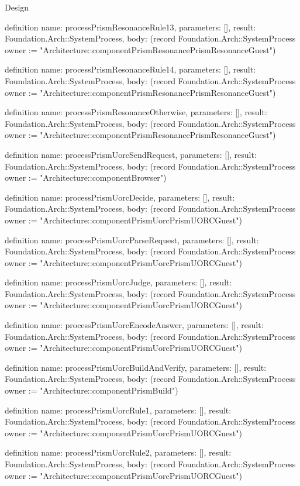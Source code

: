 \begin{lexlean}{Design}
\begin{semanticmodule}
definition{
  name: processPrismResonanceRule13,
  parameters: [],
  result: Foundation.Arch::SystemProcess,
  body: (record Foundation.Arch::SystemProcess {owner := "Architecture::componentPrismResonancePrismResonanceGuest"})
}

definition{
  name: processPrismResonanceRule14,
  parameters: [],
  result: Foundation.Arch::SystemProcess,
  body: (record Foundation.Arch::SystemProcess {owner := "Architecture::componentPrismResonancePrismResonanceGuest"})
}

definition{
  name: processPrismResonanceOtherwise,
  parameters: [],
  result: Foundation.Arch::SystemProcess,
  body: (record Foundation.Arch::SystemProcess {owner := "Architecture::componentPrismResonancePrismResonanceGuest"})
}

definition{
  name: processPrismUorcSendRequest,
  parameters: [],
  result: Foundation.Arch::SystemProcess,
  body: (record Foundation.Arch::SystemProcess {owner := "Architecture::componentBrowser"})
}

definition{
  name: processPrismUorcDecide,
  parameters: [],
  result: Foundation.Arch::SystemProcess,
  body: (record Foundation.Arch::SystemProcess {owner := "Architecture::componentPrismUorcPrismUORCGuest"})
}

definition{
  name: processPrismUorcParseRequest,
  parameters: [],
  result: Foundation.Arch::SystemProcess,
  body: (record Foundation.Arch::SystemProcess {owner := "Architecture::componentPrismUorcPrismUORCGuest"})
}

definition{
  name: processPrismUorcJudge,
  parameters: [],
  result: Foundation.Arch::SystemProcess,
  body: (record Foundation.Arch::SystemProcess {owner := "Architecture::componentPrismUorcPrismUORCGuest"})
}

definition{
  name: processPrismUorcEncodeAnswer,
  parameters: [],
  result: Foundation.Arch::SystemProcess,
  body: (record Foundation.Arch::SystemProcess {owner := "Architecture::componentPrismUorcPrismUORCGuest"})
}

definition{
  name: processPrismUorcBuildAndVerify,
  parameters: [],
  result: Foundation.Arch::SystemProcess,
  body: (record Foundation.Arch::SystemProcess {owner := "Architecture::componentPrismBuild"})
}

definition{
  name: processPrismUorcRule1,
  parameters: [],
  result: Foundation.Arch::SystemProcess,
  body: (record Foundation.Arch::SystemProcess {owner := "Architecture::componentPrismUorcPrismUORCGuest"})
}

definition{
  name: processPrismUorcRule2,
  parameters: [],
  result: Foundation.Arch::SystemProcess,
  body: (record Foundation.Arch::SystemProcess {owner := "Architecture::componentPrismUorcPrismUORCGuest"})
}


\end{semanticmodule}
\end{lexlean}
